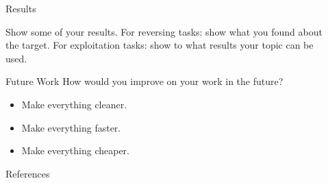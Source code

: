 \documentclass[final,dvipsnames]{beamer}
\newlength{\sepwidth}
\newlength{\colwidth}
\newcommand{\separatorcolumn}{\begin{column}{\sepwidth}\end{column}}
\begin{document}
\begin{frame}[t, fragile]
\begin{columns}[t]
\begin{column}{\colwidth}

	\begin{block}{Results}

		Show some of your results. For reversing tasks: show what you found about
		the target. For exploitation tasks: show to what results your topic can be
		used.

	\end{block}

	\begin{exampleblock}{Future Work}
		How would you improve on your work in the future?
		\begin{itemize}
			\item Make everything cleaner.
			\item Make everything faster.
			\item Make everything cheaper.
		\end{itemize}
	\end{exampleblock}

	\begin{block}{References}
		\footnotesize{}
	\end{block}

\end{column}

\separatorcolumn
\end{columns}
\end{frame}
\end{document}
